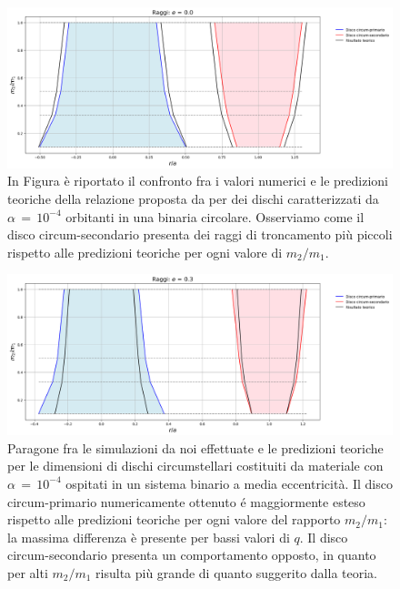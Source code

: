\begin{figure}[H]
  \centering
  \includegraphics[width=\textwidth]{Immagini/Confronto/conrag_A4_e0.png}
  \caption{In Figura è riportato il confronto fra i valori numerici e le predizioni teoriche della relazione proposta da \textcite{ManaraTronc2019} per dei dischi caratterizzati da $\alpha\,=\,10^{-4}$ orbitanti in una binaria circolare. Osserviamo come il disco circum-secondario presenta dei raggi di troncamento più piccoli rispetto alle predizioni teoriche per ogni valore di $m_2/m_1$.}
  \label{fig:conf_rag40}
\end{figure}

\begin{figure}[H]
  \centering
  \includegraphics[width=\textwidth]{Immagini/Confronto/conrag_A4_e3.png}
  \caption{Paragone fra le simulazioni da noi effettuate e le predizioni teoriche per le dimensioni di dischi circumstellari costituiti da materiale con $\alpha\,=\,10^{-4}$ ospitati in un sistema binario a media eccentricità. Il disco circum-primario numericamente ottenuto é maggiormente esteso rispetto alle predizioni teoriche per ogni valore del rapporto $m_2/m_1$: la massima differenza è presente per bassi valori di $q$. Il disco circum-secondario presenta un comportamento opposto, in quanto per alti $m_2/m_1$ risulta più grande di quanto suggerito dalla teoria.}
  \label{fig:conf_rag43}
\end{figure}

